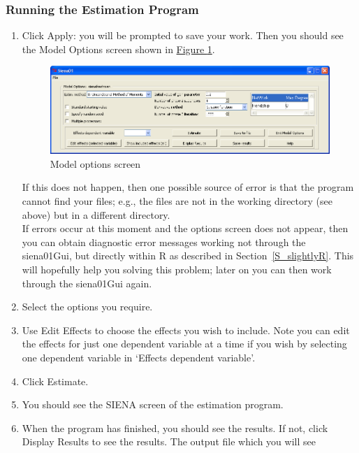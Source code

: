 \documentclass[a4paper,fleqn,11pt]{article}
\newcommand{\+}{\, + \,}
\newcommand{\sfn}[1]{\textsf{#1}}
\newcommand{\R}{{\sf R }}
\newcommand{\SI}{{\sf SIENA }}
\begin{document}
{\subsubsection{Running the Estimation Program}
\label{estgui}
\begin{enumerate}
\item Click \sfn{Apply}: you will be prompted to save your work. Then you should
  see the \sfn{Model Options} screen shown in \hyperlink{options}{Figure
    \ref{fig:options}}.
  \begin{figure}[ht]
      \hypertarget{options}{}
    \begin{center}
      \includegraphics[width=\textwidth]{siena3.png}
    \end{center}
\caption{Model options screen}
\label{fig:options}
  \end{figure}
    If this does not happen, then one possible source of error is that the
    program cannot find your files; e.g.,
    the files are not in the working directory (see above) but in a different
    directory.\\
    If errors occur at this moment and the options screen does not appear,
    then you can obtain diagnostic error messages
    working not through the \sfn{siena01Gui}, but directly  within \R
    as described in Section~\ref{S_slightlyR}.
    This will hopefully help you solving this problem; later on
    you can then work through the \sfn{siena01Gui} again.
\item Select the options you require.
\item Use \sfn{Edit Effects} to choose the effects you wish to include. Note you
  can edit the effects for just one dependent variable at a time if you wish
  by selecting one dependent variable in `Effects dependent variable'.
\item Click \sfn{Estimate}.
\item You should see the \SI screen of the estimation program.
\item When the program has finished, you should see the results. If not, click
  \sfn{Display Results} to see the results.  The output file which you will see

\end{enumerate}}
\end{document}
